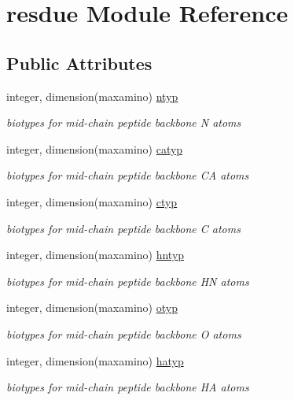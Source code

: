 \hypertarget{classresdue}{\section{resdue Module Reference}
\label{classresdue}
}
\subsection*{Public Attributes}
\begin{DoxyCompactItemize}
\item 
integer, dimension(maxamino) \hyperlink{classresdue_ad2f7d43bb9fa7978c52b73d49772f424}{ntyp}
\begin{DoxyCompactList}\small\item\em biotypes for mid-\/chain peptide backbone N atoms \end{DoxyCompactList}\item 
integer, dimension(maxamino) \hyperlink{classresdue_a25240da745223ff18029bc5158e49254}{catyp}
\begin{DoxyCompactList}\small\item\em biotypes for mid-\/chain peptide backbone C\-A atoms \end{DoxyCompactList}\item 
integer, dimension(maxamino) \hyperlink{classresdue_ab12245fc7d0a317c3184c5711ed6261d}{ctyp}
\begin{DoxyCompactList}\small\item\em biotypes for mid-\/chain peptide backbone C atoms \end{DoxyCompactList}\item 
integer, dimension(maxamino) \hyperlink{classresdue_a91612d9e842c867e9eb542ca7934ed77}{hntyp}
\begin{DoxyCompactList}\small\item\em biotypes for mid-\/chain peptide backbone H\-N atoms \end{DoxyCompactList}\item 
integer, dimension(maxamino) \hyperlink{classresdue_ae43a84a521235c9e35ba02a293139a96}{otyp}
\begin{DoxyCompactList}\small\item\em biotypes for mid-\/chain peptide backbone O atoms \end{DoxyCompactList}\item 
integer, dimension(maxamino) \hyperlink{classresdue_a3d33a8ca66e1895d0e6bbe4d393613bb}{hatyp}
\begin{DoxyCompactList}\small\item\em biotypes for mid-\/chain peptide backbone H\-A atoms \end{DoxyCompactList}\item 

\end{DoxyCompactItemize}
